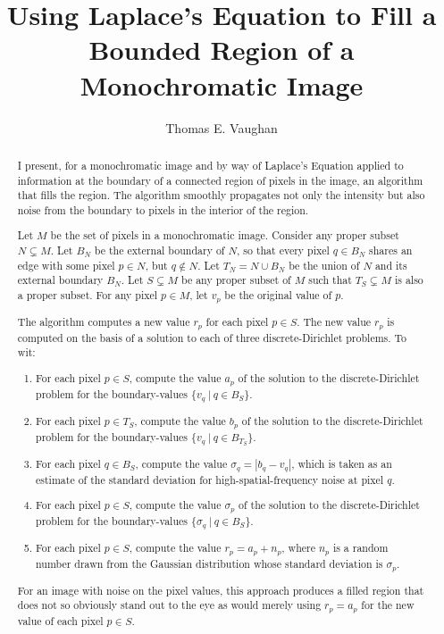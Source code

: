 \documentclass{article}
\title{%
Using Laplace's Equation to Fill a Bounded Region of a Monochromatic Image%
}
\author{Thomas E. Vaughan}
\begin{document}
\maketitle

\begin{abstract}
   I present, for a monochromatic image and by way of Laplace's Equation
   applied to information at the boundary of a connected region of pixels in
   the image, an algorithm that fills the region.  The algorithm smoothly
   propagates not only the intensity but also noise from the boundary to pixels
   in the interior of the region.

   Let $M$ be the set of pixels in a monochromatic image.  Consider any proper
   subset $N \subsetneq M$.  Let $B_N$ be the external boundary of $N$, so that
   every pixel $q \in B_N$ shares an edge with some pixel $p \in N$, but $q
   \notin N$.  Let $T_N = N \cup B_N$ be the union of $N$ and its external
   boundary $B_N$.  Let $S \subsetneq M$ be any proper subset of $M$ such that
   $T_S \subsetneq M$ is also a proper subset.  For any pixel $p \in M$, let
   $v_p$ be the original value of $p$.

   The algorithm computes a new value $r_p$ for each pixel $p \in S$.  The new
   value $r_p$ is computed on the basis of a solution to each of three
   discrete-Dirichlet problems.  To wit:
   \begin{enumerate}
      \item For each pixel $p \in S$, compute the value $a_p$ of the solution
         to the discrete-Dirichlet problem for the boundary-values $\{v_q \: |
         \: q \in B_S\}$.
      \item For each pixel $p \in T_S$, compute the value $b_p$ of the solution
         to the discrete-Dirichlet problem for the boundary-values $\{v_q \: |
         \: q \in B_{T_S}\}$.
      \item For each pixel $q \in B_S$, compute the value $\sigma_q = |b_q -
         v_q|$, which is taken as an estimate of the standard deviation for
         high-spatial-frequency noise at pixel $q$.
      \item For each pixel $p \in S$, compute the value $\sigma_p$ of the
         solution to the discrete-Dirichlet problem for the boundary-values
         $\{\sigma_q \: | \: q \in B_S\}$.
      \item For each pixel $p \in S$, compute the value $r_p = a_p + n_p$,
         where $n_p$ is a random number drawn from the Gaussian distribution
         whose standard deviation is $\sigma_p$.
   \end{enumerate}
   For an image with noise on the pixel values, this approach produces a filled
   region that does not so obviously stand out to the eye as would merely using
   $r_p = a_p$ for the new value of each pixel $p \in S$.

\end{abstract}
\end{document}
